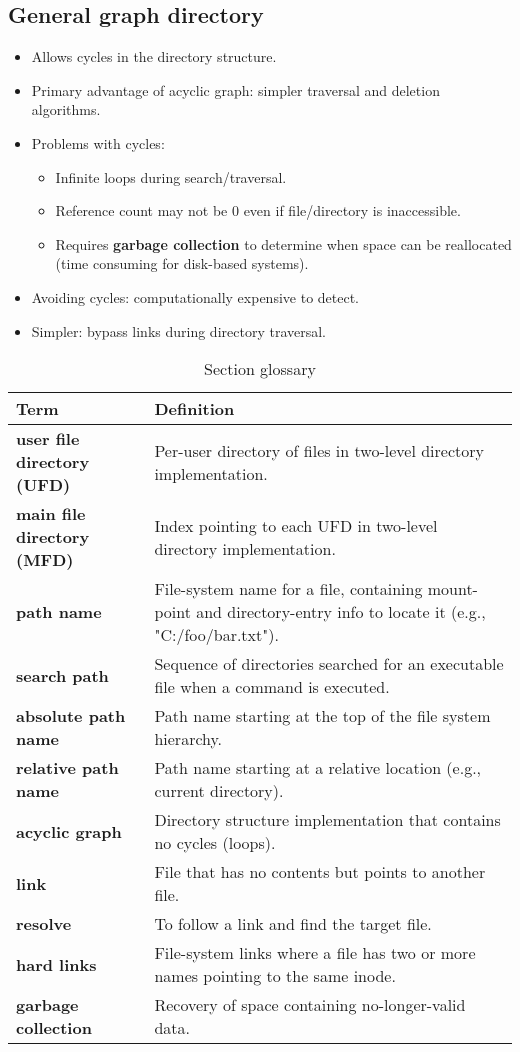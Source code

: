 \subsection{General graph directory}
\begin{itemize}
    \item Allows cycles in the directory structure.
    \item Primary advantage of acyclic graph: simpler traversal and deletion algorithms.
    \item Problems with cycles:
    \begin{itemize}
        \item Infinite loops during search/traversal.
        \item Reference count may not be 0 even if file/directory is inaccessible.
        \item Requires \textbf{garbage collection} to determine when space can be reallocated (time consuming for disk-based systems).
    \end{itemize}
    \item Avoiding cycles: computationally expensive to detect.
    \item Simpler: bypass links during directory traversal.
\end{itemize}

\begin{table}[h!]
\centering
\caption{Section glossary}
\label{tab:section_glossary}
\begin{tabular}{p{}p{}}
\toprule
\rowcolor{gray!20} \textbf{Term} & \textbf{Definition} \\
\midrule
\textbf{user file directory (UFD)} & Per-user directory of files in two-level directory implementation. \\
\textbf{main file directory (MFD)} & Index pointing to each UFD in two-level directory implementation. \\
\textbf{path name} & File-system name for a file, containing mount-point and directory-entry info to locate it (e.g., "C:/foo/bar.txt"). \\
\textbf{search path} & Sequence of directories searched for an executable file when a command is executed. \\
\textbf{absolute path name} & Path name starting at the top of the file system hierarchy. \\
\textbf{relative path name} & Path name starting at a relative location (e.g., current directory). \\
\textbf{acyclic graph} & Directory structure implementation that contains no cycles (loops). \\
\textbf{link} & File that has no contents but points to another file. \\
\textbf{resolve} & To follow a link and find the target file. \\
\textbf{hard links} & File-system links where a file has two or more names pointing to the same inode. \\
\textbf{garbage collection} & Recovery of space containing no-longer-valid data. \\
\bottomrule
\end{tabular}
\end{table}
